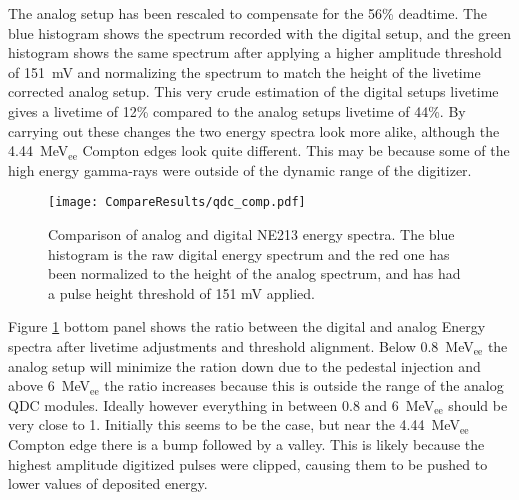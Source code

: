 \documentclass[main.tex]{subfiles}
\begin{document}
The analog setup has been rescaled to compensate for the 56\% deadtime. The blue histogram shows the spectrum recorded with the digital setup, and the green histogram shows the same spectrum after applying a higher amplitude threshold of \SI{151}{mV} and normalizing the spectrum to match the height of the livetime corrected analog setup. This very crude estimation of the digital setups livetime gives a livetime of 12\% compared to the analog setups livetime of 44\%. By carrying out these changes the two energy spectra look more alike, although the \SI{4.44}{\MeV}$_\text{ee}$ Compton edges look quite different. This may be because some of the high energy gamma-rays were outside of the dynamic range of the digitizer.

\begin{figure}[h]
    \centering
        \texttt{[image: CompareResults/qdc\_comp.pdf]}
        \caption[Comparison of analog and digital NE213 energy spectra]{Comparison of analog and digital NE213 energy spectra. The blue histogram is the raw digital energy spectrum and the red one has been normalized to the height of the analog spectrum, and has had a pulse height threshold of 151 mV applied.}
    \label{fig:qdc_comp}
\end{figure}

Figure \ref{fig:qdc_comp} bottom panel shows the ratio between the digital and analog Energy spectra after livetime adjustments and threshold alignment. Below \SI{0.8}{\MeV}$_\text{ee}$ the analog setup will minimize the ration down due to the pedestal injection and above \SI{6}{\MeV}$_\text{ee}$ the ratio increases because this is outside the range of the analog QDC modules. Ideally however everything in between 0.8 and \SI{6}{\MeV}$_\text{ee}$ should be very close to 1. Initially this seems to be the case, but near the \SI{4.44}{\MeV}$_\text{ee}$ Compton edge there is a bump followed by a valley. This is likely because the highest amplitude digitized pulses were clipped, causing them to be pushed to lower values of deposited energy.
\end{document}
